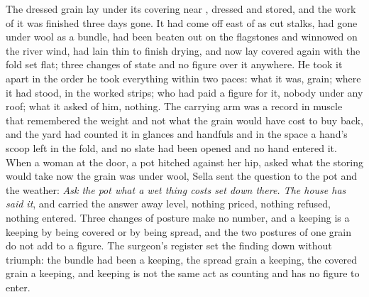 The dressed grain lay under its covering near , dressed and stored, and the work of it was finished three days gone. It had come off  east of  as cut stalks, had gone under wool as a bundle, had been beaten out on the flagstones and winnowed on the river wind, had lain thin to finish drying, and now lay covered again with the fold set flat; three changes of state and no figure over it anywhere. He took it apart in the order he took everything within two paces: what it was, grain; where it had stood, in the worked strips; who had paid a figure for it, nobody under any roof; what it asked of him, nothing. The carrying arm was a record in muscle that remembered the weight and not what the grain would have cost to buy back, and the yard had counted it in glances and handfuls and in the space a hand's scoop left in the fold, and no slate had been opened and no hand entered it. When a woman at the door, a pot hitched against her hip, asked what the storing would take now the grain was under wool, Sella sent the question to the pot and the weather: \emph{Ask the pot what a wet thing costs set down there. The house has said it}, and carried the answer away level, nothing priced, nothing refused, nothing entered. Three changes of posture make no number, and a keeping is a keeping by being covered or by being spread, and the two postures of one grain do not add to a figure. The surgeon's register set the finding down without triumph: the bundle had been a keeping, the spread grain a keeping, the covered grain a keeping, and keeping is not the same act as counting and has no figure to enter.

